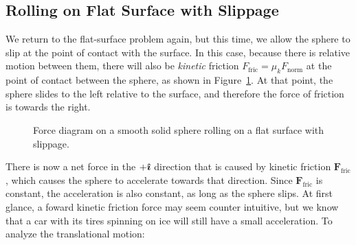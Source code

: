 \subsection{Rolling on Flat Surface with Slippage}
We return to the flat-surface problem again, but this time, we allow the sphere
to slip at the point of contact with the surface.  In this case, because there
is relative motion between them, there will also be \emph{kinetic} friction
$F_\text{fric}=\mu_kF_\text{norm}$ at the point of contact between the sphere, as
shown in Figure~\ref{slip1}. At that point, the sphere slides to the left
relative to the surface, and therefore the force of friction is towards the
right.
\begin{figure}[!ht]
  \centering
  \caption{Force diagram on a smooth solid sphere rolling on a flat surface with
    slippage.}
  \label{slip1}
\end{figure}
%
There is now a net force in the $+\bm{\hat\imath}$ direction that is caused by kinetic
friction $\bm F_\text{fric}$, which causes the sphere to accelerate towards that
direction. Since $\bm F_\text{fric}$ is constant, the acceleration is also
constant, as long as the sphere slips. At first glance, a foward kinetic
friction force may seem counter intuitive, but we know that a car with its
tires spinning on ice will still have a small acceleration. To analyze the
translational motion:
